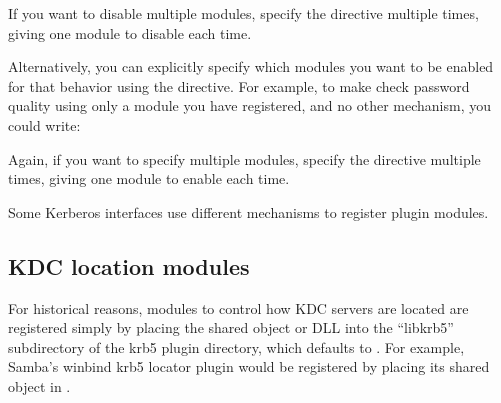 \documentclass[letterpaper,10pt,english]{sphinxmanual}
\begin{document}
%
\begin{sphinxVerbatim}[commandchars=\\\{\}]
\PYG{p}{[}\PYG{p}{]}
      
          
\end{sphinxVerbatim}

If you want to disable multiple modules, specify the 
directive multiple times, giving one module to disable each time.

Alternatively, you can explicitly specify which modules you want to be
enabled for that behavior using the  directive.  For
example, to make {\hyperref[\detokenize{admin/admin_commands/kadmind:kadmind-8}]{}} check password quality using only a
module you have registered, and no other mechanism, you could write:

%
\begin{sphinxVerbatim}[commandchars=\\\{\}]
\PYG{p}{[}\PYG{p}{]}
      
          
          
\end{sphinxVerbatim}

Again, if you want to specify multiple modules, specify the
 directive multiple times, giving one module to enable
each time.

Some Kerberos interfaces use different mechanisms to register plugin
modules.


\subsection{KDC location modules}
\label{\detokenize{admin/host_config:kdc-location-modules}}
For historical reasons, modules to control how KDC servers are located
are registered simply by placing the shared object or DLL into the
“libkrb5” subdirectory of the krb5 plugin directory, which defaults to
{\hyperref[\detokenize{mitK5defaults:paths}]{}}.  For example, Samba’s winbind krb5
locator plugin would be registered by placing its shared object in
{\hyperref[\detokenize{mitK5defaults:paths}]{}}.
\end{document}
